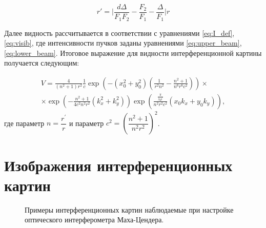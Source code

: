 \begin{equation}
    r' = \Big |\dfrac{d\Delta}{F_{1}F_{2}} - \dfrac{F_{2}}{F_{1}} - \dfrac{\Delta}{F_{1}}\Big|r
\end{equation}

Далее видность рассчитывается в соответствии с уравнениями \eqref{eq:I_def}, \eqref{eq:visib}, где интенсивности пучков заданы уравнениями \eqref{eq:upper_beam}, \eqref{eq:lower_beam}. Итоговое выражение для видности интерференционной картины получается следующим:

\begin{equation}
\begin{split}
    V =\frac{4}{\left(n^{2}+1\right) r^{2}} \frac{1}{c} \exp \left(-\left(x_{0}^{2}+y_{0}^{2}\right)\left(\frac{1}{r^{2} n^{2}}-\frac{n^{2}+1}{n^{6} r^{6} c^{2}}\right)\right) \times \\ \times \exp \left(-\frac{n^{2}+1}{4 c^{2} n^{2} r^{2}}\left(k_{x}^{2}+k_{y}^{2}\right)\right) \exp \left(\frac{\frac{\pi}{\lambda \rho^{\prime}}}{n^{2} r^{2} c^{2}}\left(x_{0} k_{x}+y_{0} k_{y}\right)\right),
\end{split}
\end{equation}
где параметр $n=\dfrac{r^{\prime}}{r}$ и параметр $c^2 = (\dfrac{n^2 + 1}{n^2r^2})^2$.

\chapter{Изображения интерференционных картин}\label{app:C}

\begin{figure}[ht]
\caption{Примеры интерференционных картин наблюдаемые при настройке оптического интерферометра Маха-Цендера.}
    \label{fig:interf_patterns}
\end{figure}


\clearpage

%
